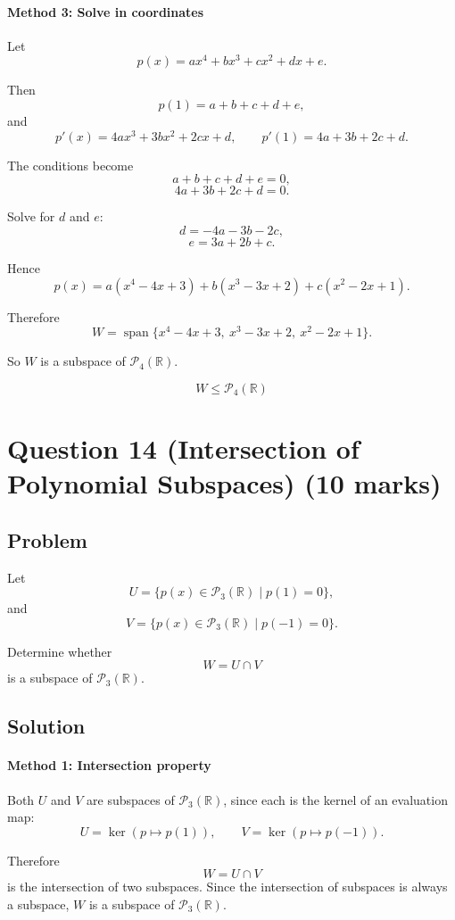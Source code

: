 \documentclass[12pt]{article}
\newcommand{\Span}{\operatorname{span}}
\begin{document}
\paragraph{Method 3: Solve in coordinates}

Let
\[
p(x)=ax^4+bx^3+cx^2+dx+e.
\]

Then
\[
p(1)=a+b+c+d+e,
\]
and
\[
p'(x)=4ax^3+3bx^2+2cx+d,
\qquad
p'(1)=4a+3b+2c+d.
\]

The conditions become
\[
a+b+c+d+e=0,
\]
\[
4a+3b+2c+d=0.
\]

Solve for \(d\) and \(e\):
\[
d=-4a-3b-2c,
\]
\[
e=3a+2b+c.
\]

Hence
\[
p(x)=a(x^4-4x+3)+b(x^3-3x+2)+c(x^2-2x+1).
\]

Therefore
\[
W=\Span\{x^4-4x+3,\ x^3-3x+2,\ x^2-2x+1\}.
\]

So \(W\) is a subspace of \(\mathcal P_4(\mathbb R)\).

\[
\boxed{W\le \mathcal P_4(\mathbb R)}
\]

\newpage
\section{Question 14 (Intersection of Polynomial Subspaces) \hfill (10 marks)}
\subsection{Problem}

Let
\[
U=\{p(x)\in\mathcal P_3(\mathbb R)\mid p(1)=0\},
\]
and
\[
V=\{p(x)\in\mathcal P_3(\mathbb R)\mid p(-1)=0\}.
\]

Determine whether
\[
W=U\cap V
\]
is a subspace of \(\mathcal P_3(\mathbb R)\).

\subsection{Solution}

\paragraph{Method 1: Intersection property}

Both \(U\) and \(V\) are subspaces of \(\mathcal P_3(\mathbb R)\), since each is the kernel of an evaluation map:
\[
U=\ker(p\mapsto p(1)),\qquad
V=\ker(p\mapsto p(-1)).
\]

Therefore
\[
W=U\cap V
\]
is the intersection of two subspaces. Since the intersection of subspaces is always a subspace, \(W\) is a subspace of \(\mathcal P_3(\mathbb R)\).
\end{document}
